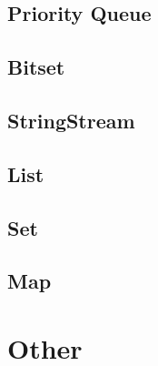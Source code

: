 \subsection{Priority Queue}


\subsection{Bitset}


\subsection{StringStream}


\subsection{List}


\subsection{Set}


\subsection{Map}


\section{Other}





